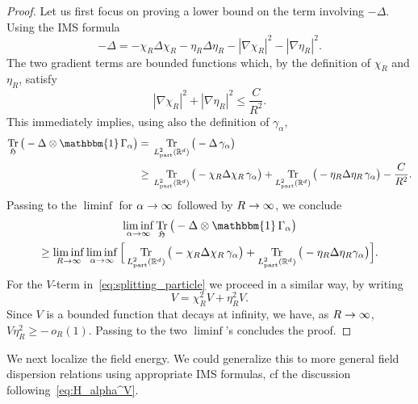 \documentclass[10pt]{amsart}
\theoremstyle{definition}\newtheorem{defi}[theo]{Definition}\newtheorem{rema}[theo]{Remark}\newtheorem{exam}[theo]{Example}\newtheorem{exem}[theo]{Example}\newtheorem{nota}[theo]{Notation}
\DeclareMathOperator{\Tr}{Tr}
\DeclareMathOperator{\partt}{part}
\newcommand{\R}{\mathbb{R}}
\newcommand{\gH}{\mathfrak{H}}
\newcommand{\1}{\mathds{1}}
\renewcommand*{\to}{\mathchoice{\longrightarrow}{\rightarrow}{\rightarrow}{\rightarrow}}
\begin{document}
\begin{proof}
Let us first focus on proving a lower bound on the term involving $-\Delta$. Using the IMS formula
\begin{equation*}
-\Delta=-\chi_R \Delta \chi_R-\eta_R \Delta \eta_R-|\nabla \chi_R|^2 - |\nabla \eta_R|^2.
\end{equation*}
The two gradient terms are bounded functions which, by the definition of $\chi_R$ and $\eta_R$, satisfy
\begin{equation*}
|\nabla\chi_R|^2+|\nabla \eta_R|^2 \le \frac{C}{R^2}.
\end{equation*}
This immediately implies, using also the definition of $\gamma_\alpha$,
\begin{equation*}
\begin{split}
\Tr_{ \gH}\big(-\Delta\otimes\mathbbm{1}\,\Gamma_\alpha \big)=\;&\Tr_{L^2_{\partt}(\R^d)}\big(-\Delta\, \gamma_\alpha\big)\\
\ge\;&\Tr_{L^2_{\partt}(\R^d)}\big(-\chi_R\Delta\chi_R \,\gamma_\alpha\big) + \Tr_{L^2_{\partt}(\R^d)}\big(-\eta_R\Delta \eta_R \,\gamma_\alpha\big)-\frac{C}{R^2}.
\end{split}
\end{equation*}
Passing to the $\liminf$ for $\alpha\to\infty$ followed by $R\to\infty$, we conclude
\begin{multline*}
\liminf_{\alpha\to\infty} \Tr_{ \gH}\big(-\Delta\otimes\mathbbm{1}\,\Gamma_\alpha \big)\\
\ge \liminf_{R \to\infty} \liminf_{\alpha\to\infty}\Big[\Tr_{L^2_{\partt}(\R^d)}\big(-\chi_R \Delta\chi_R\,\gamma_\alpha\big)+ \Tr_{L^2_{\partt}(\R^d)}\big(-\eta_R\Delta\eta_R\gamma_\alpha\big) \Big].
\end{multline*}
For the $V$-term in~\eqref{eq:splitting_particle} we proceed in a similar way, by writing
\begin{equation*}
V=\chi_R^2 V + \eta_R^2 V.
\end{equation*}
Since $V$ is a bounded function that decays at infinity, we have, as $R\to\infty$,\linebreak$V \eta_R^2 \ge - \,o_R(1)$. Passing to the two $\liminf$'s concludes the proof.
\end{proof}


We next localize the field energy. We could generalize this to more general field dispersion relations using appropriate IMS formulas, cf the discussion following~\eqref{eq:H_alpha^V}.
\end{document}
